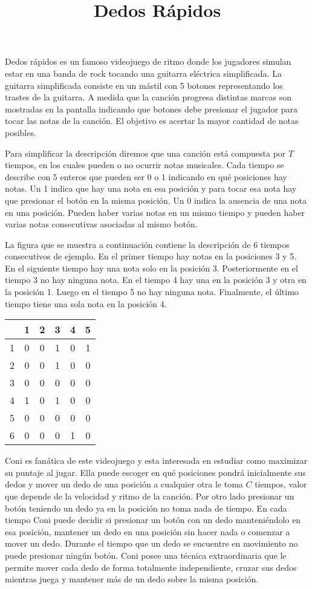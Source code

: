 \documentclass{oci}
\title{Dedos Rápidos}
\begin{document}
\begin{problemDescription}
  Dedos rápidos es un famoso videojuego de ritmo donde los jugadores simulan
  estar en una banda de rock tocando una guitarra eléctrica simplificada.
  La guitarra simplificada consiste en un mástil con 5 botones representando los
  trastes de la guitarra.
  A medida que la canción progresa distintas marcas son mostradas en la pantalla
  indicando que botones debe presionar el jugador para tocar las notas de la canción.
  El objetivo es acertar la mayor cantidad de notas posibles.

  Para simplificar la descripción diremos que una canción está compuesta por $T$
  tiempos, en los cuales pueden o no ocurrir notas musicales.
  Cada tiempo se describe con 5 enteros que pueden ser 0 o 1 indicando en qué
  posiciones hay notas.
  Un 1 indica que hay una nota en esa posición y para tocar esa nota hay que
  presionar el botón en la misma posición.
  Un 0 indica la ausencia de una nota en una posición.
  Pueden haber varias notas en un mismo tiempo y pueden haber varias
  notas consecutivas asociadas al mismo botón.

  La figura que se muestra a continuación contiene la descripción de 6 tiempos
  consecutivos de ejemplo.
  En el primer tiempo hay notas en la posiciones 3 y 5.
  En el siguiente tiempo hay una nota solo en la posición 3.
  Posteriormente en el tiempo 3 no hay ninguna nota.
  En el tiempo 4 hay una en la posición 3 y otra en la posición 1.
  Luego en el tiempo 5 no hay ninguna nota.
  Finalmente, el último tiempo tiene una sola nota en la posición 4.

  \begin{center}
    \begin{tabular}{r|ccccc}
        & 1 & 2 & 3 & 4 & 5 \\
      \hline
      1 & 0 & 0 & 1 & 0 & 1 \\
      2 & 0 & 0 & 1 & 0 & 0 \\
      3 & 0 & 0 & 0 & 0 & 0 \\
      4 & 1 & 0 & 1 & 0 & 0 \\
      5 & 0 & 0 & 0 & 0 & 0 \\
      6 & 0 & 0 & 0 & 1 & 0 \\
    \end{tabular}
  \end{center}

  Coni es fanática de este videojuego y esta interesada en estudiar como
  maximizar su puntaje al jugar.
  Ella puede escoger en qué posiciones pondrá inicialmente sus dedos y mover un
  dedo de una posición a cualquier otra le toma $C$ tiempos, valor que depende
  de la velocidad y ritmo de la canción.
  Por otro lado presionar un botón teniendo un dedo ya en la posición no toma
  nada de tiempo.
  En cada tiempo Coni puede decidir si presionar un botón con un dedo
  manteniéndolo en esa posición, mantener un dedo en una posición sin hacer nada
  o comenzar a mover un dedo.
  Durante el tiempo que un dedo se encuentre en movimiento no puede presionar
  ningún botón.
  Coni posee una técnica extraordinaria que le permite mover cada dedo
  de forma totalmente independiente, cruzar sus dedos mientras juega y mantener
  más de un dedo sobre la misma posición.


\end{problemDescription}
\end{document}
